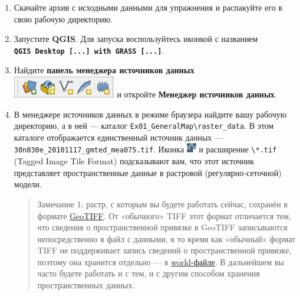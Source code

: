 \documentclass[
  12pt,
]{book}
\begin{document}
\begin{enumerate}
\def\labelenumi{\arabic{enumi}.}
\item
  Скачайте архив с исходными данными для упражнения и распакуйте его в свою рабочую директорию.
\item
  Запустите \textbf{QGIS}. Для запуска воспользуйтесь иконкой с названием \textbf{\texttt{QGIS\ Desktop\ {[}...{]}\ with\ GRASS\ {[}...{]}}}.
\item
  Найдите \textbf{панель менеджера источников данных} \includegraphics{images/Ex01/pic01.png} и откройте \textbf{Менеджер источников данных}.
\item
  В менеджере источников данных в режиме браузера найдите вашу рабочую директорию, а в ней --- каталог \texttt{Ex01\_GeneralMap\textbackslash{}raster\_data}. В этом каталоге отображается единственный источник данных --- \texttt{30n030e\_20101117\_gmted\_mea075.tif}. Иконка \includegraphics{images/Ex01/raster.png} и расширение \texttt{\textbackslash{}*.tif} (Tagged Image Tile Format) подсказывают вам, что этот источник представляет пространственные данные в растровой (регулярно-сеточной) модели.

  \begin{quote}
  Замечание 1: растр, с которым вы будете работать сейчас, сохранён в формате \href{https://www.opengeospatial.org/standards/geotiff}{GeoTIFF}. От «обычного» TIFF этот формат отличается тем, что сведения о пространственной привязке в GeoTIFF записываются непосредственно в файл с данными, в то время как «обычный» формат TIFF не поддерживает запись сведений о пространственной привязке, поэтому она хранится отдельно --- в \href{https://en.wikipedia.org/wiki/World_file}{world-файле}. В дальнейшем вы часто будете работать и с тем, и с другим способом хранения пространственных данных.
  \end{quote}


\end{enumerate}
\end{document}
